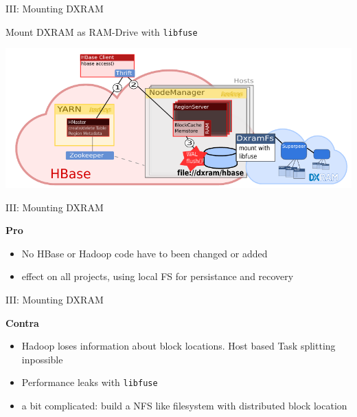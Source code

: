 \begin{frame}[fragile]{III: Mounting DXRAM}
\protect\hypertarget{iii-mounting-dxram}{}

Mount DXRAM as RAM-Drive with \texttt{libfuse}

\includegraphics{fig/mountable.pdf}

\end{frame}

\begin{frame}{III: Mounting DXRAM}
\protect\hypertarget{iii-mounting-dxram-1}{}

\textbf{Pro}

\begin{itemize}
\tightlist
\item
  No HBase or Hadoop code have to been changed or added
\item
  effect on all projects, using local FS for persistance and recovery
\end{itemize}

\end{frame}

\begin{frame}[fragile]{III: Mounting DXRAM}
\protect\hypertarget{iii-mounting-dxram-2}{}

\textbf{Contra}

\begin{itemize}
\tightlist
\item
  Hadoop loses information about block locations. Host based Task
  splitting inpossible
\item
  Performance leaks with \texttt{libfuse}
\item
  a bit complicated: build a NFS like filesystem with distributed block
  location
\end{itemize}

\end{frame}

